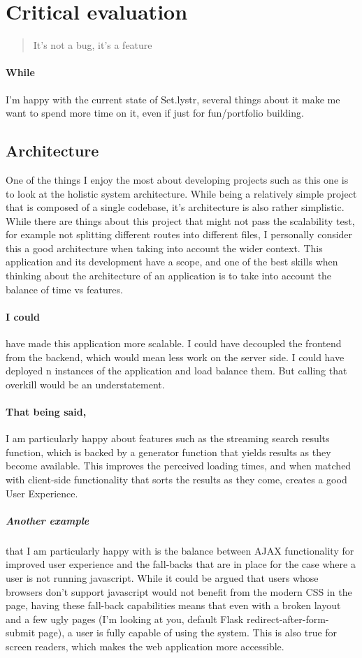 \documentclass[10pt, a4paper]{article}
\begin{document}
\section{Critical evaluation}

    \blockquote{It's not a bug, it's a feature}
    
	\paragraph{While} I'm happy with the current state of Set.lystr, several things about it make me want to spend more time on it, even if just for fun/portfolio building.

	\subsection{Architecture}
	One of the things I enjoy the most about developing projects such as this one is to look at the holistic  system architecture. While being a relatively simple project that is composed of a single codebase, it's architecture is also rather simplistic. While there are things about this project that might not pass the scalability test, for example not splitting different routes into different files, I personally consider this a good architecture when taking into account the wider context. This application and its development have a scope, and one of the best skills when thinking about the architecture of an application is to take into account the balance of time vs features.
	\paragraph{I could} have made this application more scalable. I could have decoupled the frontend from the backend, which would mean less work on the server side. I could have deployed n instances of the application and load balance them. But calling that overkill would be an understatement.
	\paragraph{That being said,} I am particularly happy about features such as the streaming search results function, which is backed by a generator function that yields results as they become available. This improves the perceived loading times, and when matched with client-side functionality that sorts the results as they come, creates a good User Experience.
	\subparagraph{Another example} that I am particularly happy with is the balance between AJAX functionality for improved user experience and the fall-backs that are in place for the case where a user is not running javascript. While it could be argued that users whose browsers don't support javascript would not benefit from the modern CSS in the page, having these fall-back capabilities means that even with a broken layout and a few ugly pages (I'm looking at you, default Flask redirect-after-form-submit page), a user is fully capable of using the system. This is also true for screen readers, which makes the web application more accessible.
	
\end{document}
